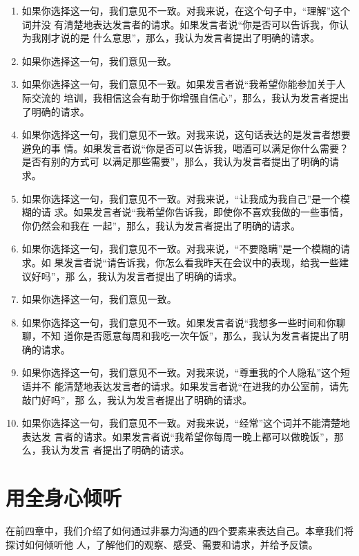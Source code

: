 \documentclass{ctexart}
\begin{document}
\begin{enumerate}
	\item 如果你选择这一句，我们意见不一致。对我来说，在这个句子中，``理解''这个词并没
	      有清楚地表达发言者的请求。如果发言者说``你是否可以告诉我，你认为我刚才说的是
	      什么意思''，那么，我认为发言者提出了明确的请求。
	\item 如果你选择这一句，我们意见一致。
	\item 如果你选择这一句，我们意见不一致。如果发言者说``我希望你能参加关于人际交流的
	      培训，我相信这会有助于你增强自信心''，那么，我认为发言者提出了明确的请求。
	\item 如果你选择这一句，我们意见不一致。对我来说，这句话表达的是发言者想要避免的事
	      情。如果发言者说``你是否可以告诉我，喝酒可以满足你什么需要？是否有别的方式可
	      以满足那些需要''，那么，我认为发言者提出了明确的请求。
	\item 如果你选择这一句，我们意见不一致。对我来说，``让我成为我自己''是一个模糊的请
	      求。如果发言者说``我希望你告诉我，即使你不喜欢我做的一些事情，你仍然会和我在
	      一起''，那么，我认为发言者提出了明确的请求。
	\item 如果你选择这一句，我们意见不一致。对我来说，``不要隐瞒''是一个模糊的请求。如
	      果发言者说``请告诉我，你怎么看我昨天在会议中的表现，给我一些建议好吗''，那
	      么，我认为发言者提出了明确的请求。
	\item 如果你选择这一句，我们意见一致。
	\item 如果你选择这一句，我们意见不一致。如果发言者说``我想多一些时间和你聊聊，不知
	      道你是否愿意每周和我吃一次午饭''，那么，我认为发言者提出了明确的请求。
	\item 如果你选择这一句，我们意见不一致。对我来说，``尊重我的个人隐私''这个短语并不
	      能清楚地表达发言者的请求。如果发言者说``在进我的办公室前，请先敲门好吗''，那
	      么，我认为发言者提出了明确的请求。
	\item 如果你选择这一句，我们意见不一致。对我来说，``经常''这个词并不能清楚地表达发
	      言者的请求。如果发言者说``我希望你每周一晚上都可以做晚饭''，那么，我认为发言
	      者提出了明确的请求。
\end{enumerate}

\section{用全身心倾听}\label{sec:用全身心倾听}

在前四章中，我们介绍了如何通过非暴力沟通的四个要素来表达自己。本章我们将探讨如何倾听他
人，了解他们的观察、感受、需要和请求，并给予反馈。
\end{document}
